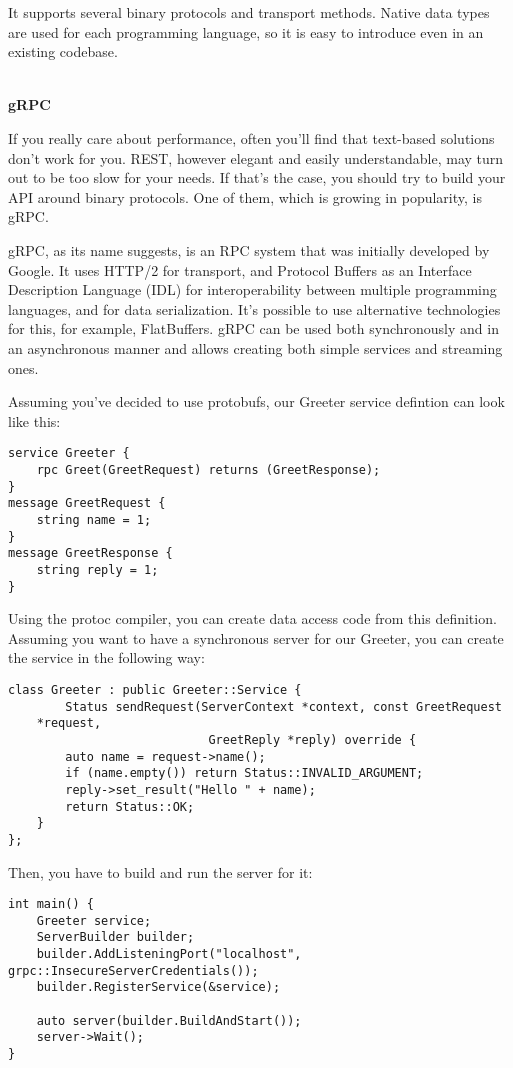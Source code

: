 It supports several binary protocols and transport methods. Native data types are used for each programming language, so it is easy to introduce even in an existing codebase.

\hspace*{\fill} \\ %
\noindent
\textbf{gRPC}

If you really care about performance, often you'll find that text-based solutions don't work for you. REST, however elegant and easily understandable, may turn out to be too slow for your needs. If that's the case, you should try to build your API around binary protocols. One of them, which is growing in popularity, is gRPC.

gRPC, as its name suggests, is an RPC system that was initially developed by Google. It uses HTTP/2 for transport, and Protocol Buffers as an Interface Description Language (IDL) for interoperability between multiple programming languages, and for data serialization. It's possible to use alternative technologies for this, for example, FlatBuffers. gRPC can be used both synchronously and in an asynchronous manner and allows creating both simple services and streaming ones. 

Assuming you've decided to use protobufs, our Greeter service defintion can look like this:

\begin{lstlisting}[style=styleCXX]
service Greeter {
	rpc Greet(GreetRequest) returns (GreetResponse);
}
message GreetRequest {
	string name = 1;
}
message GreetResponse {
	string reply = 1;
}
\end{lstlisting}

Using the protoc compiler, you can create data access code from this definition. Assuming you want to have a synchronous server for our Greeter, you can create the service in the following way:

\begin{lstlisting}[style=styleCXX]
class Greeter : public Greeter::Service {
		Status sendRequest(ServerContext *context, const GreetRequest
	*request,
							GreetReply *reply) override {
		auto name = request->name();
		if (name.empty()) return Status::INVALID_ARGUMENT;
		reply->set_result("Hello " + name);
		return Status::OK;
	}
};
\end{lstlisting}

Then, you have to build and run the server for it:

\begin{lstlisting}[style=styleCXX]
int main() {
	Greeter service;
	ServerBuilder builder;
	builder.AddListeningPort("localhost", grpc::InsecureServerCredentials());
	builder.RegisterService(&service);
	
	auto server(builder.BuildAndStart());
	server->Wait();
}
\end{lstlisting}

